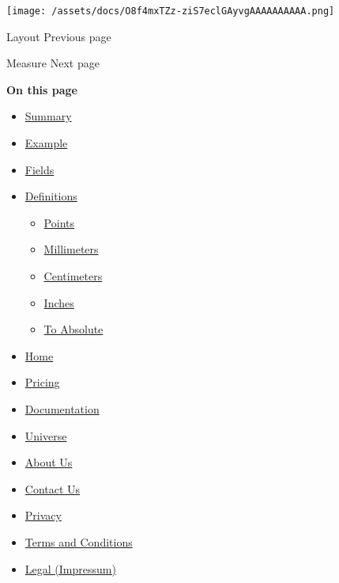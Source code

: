 \texttt{[image: /assets/docs/O8f4mxTZz-ziS7eclGAyvgAAAAAAAAAA.png]}

\href{/docs/reference/layout/layout/}{\pandocbounded{}}

{ Layout } { Previous page }

\href{/docs/reference/layout/measure/}{\pandocbounded{}}

{ Measure } { Next page }

\textbf{On this page}

\begin{itemize}
\tightlist
\item
  \hyperref[summary]{Summary}
\item
  \hyperref[example]{Example}
\item
  \hyperref[fields]{Fields}
\item
  \hyperref[definitions]{Definitions}

  \begin{itemize}
  \tightlist
  \item
    \hyperref[definitions-pt]{Points}
  \item
    \hyperref[definitions-mm]{Millimeters}
  \item
    \hyperref[definitions-cm]{Centimeters}
  \item
    \hyperref[definitions-inches]{Inches}
  \item
    \hyperref[definitions-to-absolute]{To Absolute}
  \end{itemize}
\end{itemize}

\begin{itemize}
\tightlist
\item
  \href{/}{Home}
\item
  \href{/pricing/}{Pricing}
\item
  \href{/docs/}{Documentation}
\item
  \href{/universe/}{Universe}
\item
  \href{/about/}{About Us}
\item
  \href{/contact/}{Contact Us}
\item
  \href{/privacy/}{Privacy}
\item
  \href{https://typst.app/terms}{Terms and Conditions}
\item
  \href{/legal/}{Legal (Impressum)}
\end{itemize}

